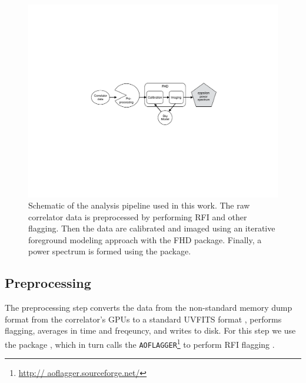 \documentclass[iop]{emulateapj}
\begin{document}
\begin{figure}
\begin{center}
\includegraphics[width=\columnwidth]{pipe.pdf}
\caption[Pipeline diagram]{
Schematic of the analysis pipeline used in this work. The raw correlator data is 
preprocessed by performing RFI and other flagging. Then the data are calibrated and 
imaged using an iterative foreground modeling approach with the FHD package. Finally, a 
power spectrum is formed using the \eppsilon package.
\label{fig:pipe}
}
\end{center}
\end{figure}

\subsection{Preprocessing}\label{subsec:preprocessing}
The preprocessing step converts the data from the non-standard memory dump format 
from the correlator's GPUs to a standard UVFITS format \citep{Greisen:2012}, performs 
flagging, averages in time and freqeuncy, and writes to disk. For this step we use the 
\cotter package \citep{Offringa:2015}, which in turn calls the \texttt{AOFLAGGER}\footnote{\url{http://
aoflagger.sourceforge.net/}} to perform RFI flagging \citep{Offringa:2010}. 
\end{document}
